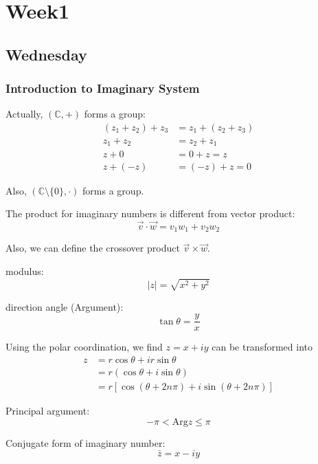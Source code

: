 
\chapter{Week1}

\section{Wednesday}
\subsection{Introduction to Imaginary System}

Actually, $(\mathbb{C},+)$ forms a group:
\begin{align*}
(z_1+z_2)+z_3&=z_1+(z_2+z_3)\\
z_1+z_2&=z_2+z_1\\
z+0&=0+z=z\\
z+(-z)&=(-z)+z=0
\end{align*}

Also, $(\mathbb{C}\setminus\{0\},\cdot)$ forms a group.

The product for imaginary numbers is different from vector product:
\[
\vec v\cdot\vec w = v_1w_1+v_2w_2
\]

Also, we can define the crossover product $\vec v\times\vec w$.

modulus:
\[
|z| = \sqrt{x^2+y^2}
\]

direction angle (Argument):
\[
\tan\theta=\frac{y}{x}
\]

Using the polar coordination, we find $z=x+iy$ can be transformed into
\begin{align*}
z&=r\cos\theta+ir\sin\theta\\
&=r(\cos\theta+i\sin\theta)\\
&=r\left[\cos(\theta+2n\pi) + i\sin(\theta+2n\pi)\right]
\end{align*}

Principal argument:
\[
-\pi<\mbox{Arg}z\le\pi
\]

Conjugate form of imaginary number:
\[
\bar z = x-iy
\]

